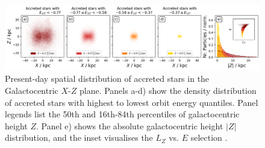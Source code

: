 \documentclass[fleqn,usenatbib]{mnras}
\begin{document}
\begin{figure}
    \centering
    \includegraphics[width=\textwidth]{figures/xz_distribution_ezones.png}
    \caption{Present-day spatial distribution of accreted stars in the Galactocentric $X$-$Z$ plane. Panels a-d) show the density distribution of accreted stars with highest to lowest orbit energy quantiles. Panel legends list the 50th and 16th-84th percentiles of galactocentric height $Z$. Panel e) shows the absolute galactocentric height $\vert Z \vert$ distribution, and the inset visualises the $L_Z$ vs. $E$ selection \href{https://github.com/svenbuder/gse_nihaouhd/tree/main/figures}{\faGithub}.}
    \label{fig:xz_distribution_ezones}
\end{figure}
\end{document}

